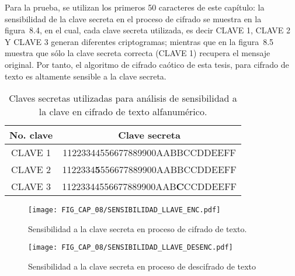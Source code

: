 Para la prueba, se utilizan los primeros 50 caracteres de este capítulo: la sensibilidad de la clave secreta en el proceso de cifrado se muestra en la figura~8.4, en el cual, cada clave secreta utilizada, es decir CLAVE 1, CLAVE 2 Y CLAVE 3 generan diferentes criptogramas; mientras que en la figura~8.5 muestra que sólo la clave secreta correcta (CLAVE 1) recupera el mensaje original. Por tanto, el algoritmo de cifrado caótico de esta tesis, para cifrado de texto es altamente sensible a la clave secreta. 
\begin{table}[!htbp] %
	\center
	\begin{tabular}{c c} 
	\hline
	No. clave & Clave secreta \\
	\hline
	CLAVE 1	& 	11223344556677889900AABBCCDDEEFF	\\
	CLAVE 2	& 	1122334\textbf{{\large 5}}556677889900AABBCCDDEEFF	\\ 	
	CLAVE 3	& 	11223344556677889900AAB\textbf{{\large C}}CCDDEEFF	\\
	\hline
\end{tabular}
	\caption{Claves secretas utilizadas para análisis de sensibilidad a la clave en cifrado de texto alfanumérico.}
\end{table}

\begin{figure}[!htbp] %
	\center
	\texttt{[image: FIG\_CAP\_08/SENSIBILIDAD\_LLAVE\_ENC.pdf]}     
	\caption{Sensibilidad a la clave secreta en proceso de cifrado de texto.}
\end{figure}

\begin{figure}[!htbp] %
	\center
	\texttt{[image: FIG\_CAP\_08/SENSIBILIDAD\_LLAVE\_DESENC.pdf]}     
	\caption{Sensibilidad a la clave secreta en proceso de descifrado de texto}
\end{figure}

\newpage
